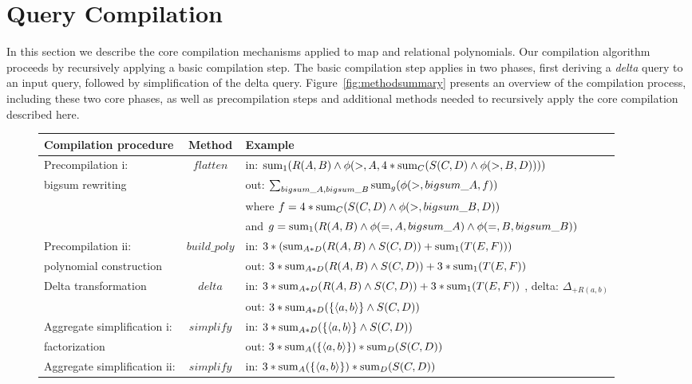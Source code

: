\section{Query Compilation}
In this section we describe the core compilation mechanisms applied to map and
relational polynomials. Our compilation algorithm proceeds by recursively
applying a basic compilation step. The basic compilation step applies in two
phases, first deriving a \textit{delta} query to an input query, followed by
simplification of the delta query. Figure~\ref{fig:methodsummary} presents an
overview of the compilation process, including these two core phases, as well as
precompilation steps and additional methods needed to recursively apply the core
compilation described here.

\begin{figure*}[htbp]
\begin{center}
\begin{tabular}{|l|c|l|}
\hline
Compilation procedure & Method & Example \\
\hline Precompilation i:            & $flatten$
& in: $\mathrm{sum}_{1}(R(A,B) \wedge \phi(>,A,4*
           \mathrm{sum}_{C}(S(C,D) \wedge \phi(>,B,D))))$
\\
bigsum rewriting & & out: $\sum_{bigsum\_A, bigsum\_B}{\mathrm{sum}_{g} (\phi(>,bigsum\_A, f))}$
\\
& & where $f = 4* \mathrm{sum}_{C}(S(C,D) \wedge \phi(>,bigsum\_B,D))$
\\
& & and $g = \mathrm{sum}_{1}(R(A,B) \wedge \phi(=,A,bigsum\_A)
           \wedge \phi(=,B,bigsum\_B))$
\\
\hline Precompilation ii:  & $build\_poly$
& in: $3 * (\mathrm{sum}_{A*D}(R(A,B) \wedge S(C,D)) + \mathrm{sum}_{1}(T(E,F)))$
\\
polynomial construction &
& out: $3*\mathrm{sum}_{A*D}(R(A,B) \wedge S(C,D)) + 3*\mathrm{sum}_{1}(T(E,F))$
\\
\hline Delta transformation        & $delta$
& in:
    $ 3*\mathrm{sum}_{A*D}(R(A,B) \wedge S(C,D)) +
     3*\mathrm{sum}_{1}(T(E,F))$
, delta: $\Delta_{+R(a,b)}$
\\
& & out:
    $3*\mathrm{sum}_{A*D}(\{{\langle a,b\rangle}\} \wedge S(C,D))$
\\
\hline Aggregate simplification i:  & $simplify$
& in: $3*\mathrm{sum}_{A*D}(\{{\langle a,b\rangle}\} \wedge S(C,D))$
\\
factorization & & out:
    $3*\mathrm{sum}_{A}(\{{\langle a,b\rangle}\})*\mathrm{sum}_{D}(S(C,D))$
\\
\hline Aggregate simplification ii: & $simplify$
& in: $3*\mathrm{sum}_{A}(\{{\langle a,b\rangle}\})*\mathrm{sum}_{D}(S(C,D))$

\end{tabular}
\end{center}
\end{figure*}
